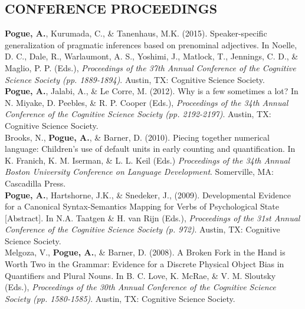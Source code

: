\documentclass[margin, 7pt]{res} %
\begin{document}
\begin{resume}
 
 \section{CONFERENCE PROCEEDINGS}
 
{\bf Pogue, A.}, Kurumada, C., \& Tanenhaus, M.K. (2015). Speaker-specific generalization of pragmatic inferences based on prenominal adjectives. In Noelle, D. C., Dale, R., Warlaumont, A. S., Yoshimi, J., Matlock, T., Jennings, C. D., \& Maglio, P. P. (Eds.), {\sl Proceedings of the 37th Annual Conference of the Cognitive Science Society (pp. 1889-1894)}. Austin, TX: Cognitive Science Society.\medskip \\
{\bf Pogue, A.}, Jalabi, A., \& Le Corre, M. (2012). Why is a few sometimes a lot? In N. Miyake, D. Peebles, \& R. P. Cooper (Eds.), {\sl Proceedings of the 34th Annual Conference of the Cognitive Science Society (pp. 2192-2197)}. Austin, TX: Cognitive Science Society. \medskip \\
Brooks, N., {\bf Pogue, A.}, \& Barner, D. (2010). Piecing together numerical language: Children's use of default units in early counting and quantification. In K. Franich, K. M. Iserman, \& L. L. Keil (Eds.) {\sl Proceedings of the 34th Annual Boston University Conference on Language Development}. Somerville, MA: Cascadilla Press. \medskip \\
{\bf Pogue, A.}, Hartshorne, J.K., \& Snedeker, J., (2009). Developmental Evidence for a Canonical Syntax-Semantics Mapping for Verbs of Psychological State [Abstract]. In N.A. Taatgen \& H. van Rijn (Eds.), {\sl Proceedings of the 31st Annual Conference of the Cognitive Science Society (p. 972)}. Austin, TX: Cognitive Science Society. \medskip \\
Melgoza, V., {\bf Pogue, A.}, \& Barner, D. (2008). A Broken Fork in the Hand is Worth Two in the Grammar: Evidence for a Discrete Physical Object Bias in Quantifiers and Plural Nouns. In B. C. Love, K. McRae, \& V. M. Sloutsky (Eds.), {\sl Proceedings of the 30th Annual Conference of the Cognitive Science Society (pp. 1580-1585)}. Austin, TX: Cognitive Science Society. \\

 

\end{resume}
\end{document}
